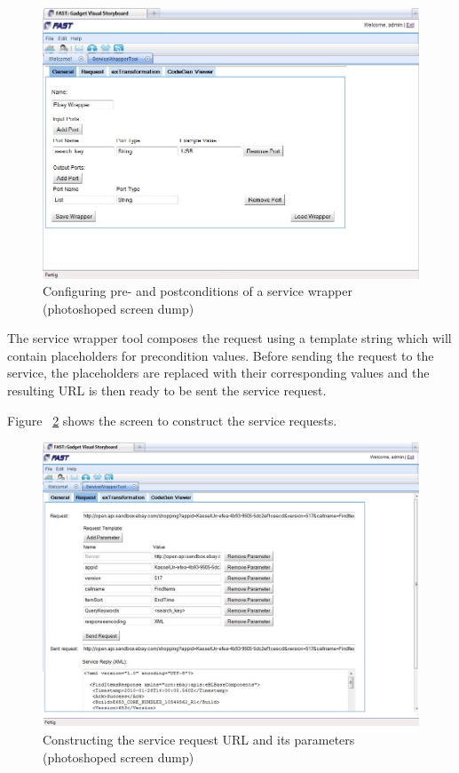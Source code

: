 \documentclass{fast_latex}
\begin{document}
\begin{figure}
  \begin{center} \includegraphics[width=\linewidth]{images/ServiceWrapperToolGVSWithPortDefinitions.jpg}
    \caption{Configuring pre- and postconditions of a service wrapper (photoshoped screen dump)}
    \label{fig:construct_pre_post_conditions}
  \end{center}
\end{figure}

The service wrapper tool composes the request using a template string which will contain placeholders for precondition values. Before sending the request to the service, the placeholders are replaced with their corresponding values and the resulting URL is then ready to be sent the service request.

Figure ~\ref{fig:construct_service_request} shows the screen to construct the service requests.

\begin{figure}
  \begin{center}
    \includegraphics[width=\linewidth]{images/ServiceWrapperToolGVSWithRequestExample.jpg}
    \caption{Constructing the service request URL and its parameters (photoshoped screen dump)}
    \label{fig:construct_service_request}
  \end{center}
\end{figure}
\end{document}
